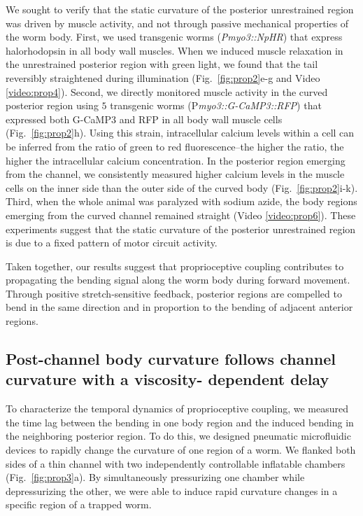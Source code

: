 We sought to verify that the static curvature of the posterior unrestrained region was driven by 
muscle activity, and not through passive mechanical properties of the worm body. First, we used 
transgenic worms (\textit{Pmyo3::NpHR}) that express halorhodopsin \citep{han_multiple-color_2007} in all body wall muscles. 
When we induced muscle relaxation in the unrestrained posterior region with green light, we 
found that the tail reversibly straightened during illumination (Fig.~\ref{fig:prop2}e-g and 
Video \ref{video:prop4}). Second, we directly monitored muscle activity in the curved posterior region using 
 $5$
transgenic worms (P\textit{myo3::G-CaMP3::RFP}) that expressed both G-CaMP3 and RFP in all body 
wall muscle cells (Fig.~\ref{fig:prop2}h). Using this strain, intracellular calcium levels within a cell can be 
inferred from the ratio of green to red fluorescence--the higher the ratio, the higher the 
intracellular calcium concentration. In the posterior region emerging from the channel, we 
consistently measured higher calcium levels in the muscle cells on the inner side than the outer 
side of the curved body (Fig.~\ref{fig:prop2}i-k). Third, when the whole animal was paralyzed with sodium 
azide, the body regions emerging from the curved channel remained straight (Video \ref{video:prop6}). These experiments suggest that the static curvature of the posterior unrestrained region 
is due to a fixed pattern of motor circuit activity. 


Taken together, our results suggest that proprioceptive coupling contributes to propagating the 
bending signal along the worm body during forward movement. Through positive stretch-sensitive feedback, posterior regions are compelled to bend in the same direction and in 
proportion to the bending of adjacent anterior regions. 
 
\subsection{Post-channel body curvature follows channel curvature with a viscosity- 
dependent delay}
 
To characterize the temporal dynamics of proprioceptive coupling, we measured the time lag 
between the bending in one body region and the induced bending in the neighboring posterior 
region. To do this, we designed pneumatic microfluidic devices to rapidly change the curvature 
of one region of a worm. We flanked both sides of a thin channel with two independently 
controllable inflatable chambers (Fig.~\ref{fig:prop3}a). By simultaneously pressurizing one chamber while 
depressurizing the other, we were able to induce rapid curvature changes in a specific region of a 
trapped worm. 

